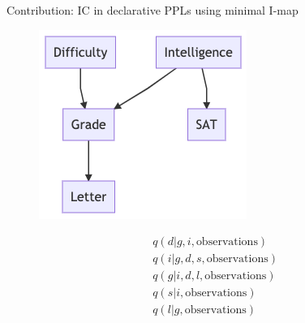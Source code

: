 \documentclass{beamer}
\begin{document}
\begin{frame}[fragile]{Contribution: IC in declarative PPLs using minimal I-map}
    \begin{minipage}{0.4\linewidth}
    \begin{figure}
        \centering
        \includegraphics[width=\linewidth]{figures/student-network.png}
    \end{figure}
\end{minipage}
\begin{minipage}{0.5\linewidth}
\begin{align*}
    & q(d | g, i, \text{observations}) \\
    & q(i | g, d, s, \text{observations}) \\
    & q(g | i, d, l, \text{observations}) \\
    & q(s | i, \text{observations}) \\
    & q(l | g, \text{observations})
\end{align*}
\end{minipage}
\end{frame}
\end{document}

